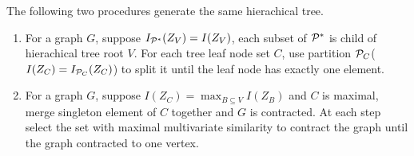 \begin{proposition}\label{prop:ta}
The following two procedures generate the same hierachical tree.
\begin{enumerate}
\item For a graph $G$, suppose $I_{\P^*}(Z_V)=I(Z_V)$, each subset of $\P^*$ is child of hierachical tree root $V$. For each tree leaf node set $C$, use partition $\P_C$($I(Z_C)=I_{\P_C}(Z_C)$) to split it until the leaf node has exactly one element.
\item For a graph $G$, suppose $I(Z_C) = \max_{B\subseteq V} I(Z_B)$ and $C$ is maximal, merge singleton element of $C$ together and $G$ is contracted. At each step select the set with maximal multivariate similarity to contract the graph until the graph contracted to one vertex.
\end{enumerate}
\end{proposition}